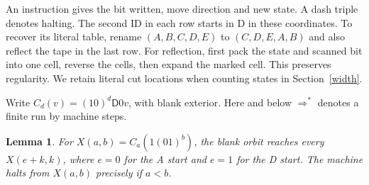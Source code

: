 \documentclass[11pt]{article}
\newtheorem{lemma}[theorem]{Lemma}
\newcommand{\state}[1]{\mathsf{#1}}
\newcommand{\run}{\mathrel{\Rightarrow^{*}}}
\begin{document}
An instruction gives the bit written, move direction and new state. A dash triple denotes halting. The second ID in each row starts in D in these coordinates. To recover its literal table, rename \((A,B,C,D,E)\) to \((C,D,E,A,B)\) and also reflect the tape in the last row. For reflection, first pack the state and scanned bit into one cell, reverse the cells, then expand the marked cell. This preserves regularity. We retain literal cut locations when counting states in Section~\ref{width}.

Write \(C_d(v)=(10)^d\state D0v\), with blank exterior. Here and below \(\run\) denotes a finite run by machine steps.

\begin{lemma}\label{baldiag}
For \(X(a,b)=C_a(1(01)^b)\), the blank orbit reaches every \(X(e+k,k)\), where \(e=0\) for the A start and \(e=1\) for the D start. The machine halts from \(X(a,b)\) precisely if \(a<b\).
\end{lemma}
\end{document}
